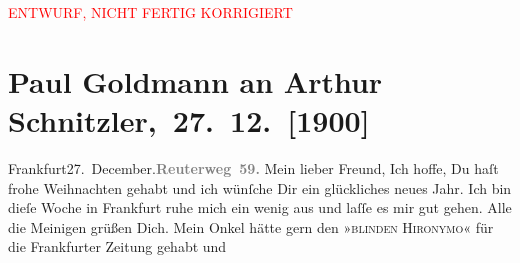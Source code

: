 
\begin{center}
            \textcolor{red}{ENTWURF, NICHT FERTIG KORRIGIERT}
                      \end{center}
            
         
         \renewcommand{\erwaehntePersonen}{Personen: Gisela Hajek, Fedor Mamroth, Josef Rosengart, Louise Schnitzler, Julius Schnitzler, Helene Schnitzler}
         \renewcommand{\erwaehnteInstitutionen}{Institutionen: Volkstheater}
         \renewcommand{\erwaehnteOrte}{Orte: Frankfurt am Main, Reuterweg, Wien}
         \renewcommand{\erwaehnteWerke}{Werke: Der Schleier der Beatrice. Schauspiel in fünf Akten, Der blinde Geronimo und sein Bruder, Frankfurter Zeitung, Lieutenant Gustl. Novelle, Neue Freie Presse}
               \section[ Paul Goldmann an Arthur Schnitzler, 27. 12. {[}1900{]}]{ Paul Goldmann an Arthur Schnitzler, 27. 12. {[}1900{]}}\nopagebreak{}\rehead{ }\begin{ledgroupsized}[t]{13cm}\normalsize\beginnumbering \toendnotes[C]{\smallbreak\pagebreak[2]} 
\toendnotes[C]{\smallbreak}\pstart
           \noindent{}{\pb}Frankfurt27. December.\hfill \textcolor{gray}{\textbf{Reuterweg 59.}}\pend
           \pstart
           \centering{}Mein lieber Freund,\pend
           \pstart
           \noindent{}Ich hoffe, Du haſt frohe Weihnachten gehabt und ich wünſche Dir ein glückliches neues
                  Jahr.\pend
           \pstart
           Ich bin dieſe Woche in Frankfurt ruhe mich ein
               wenig aus und laſſe es mir gut gehen.\pend
           \pstart
           Alle die Meinigen grüßen Dich. Mein Onkel hätte gern den »\textsc{blinden Hironymo}« für die Frankfurter Zeitung gehabt und

\end{ledgroupsized}
